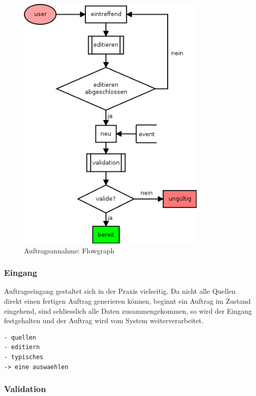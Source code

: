 \begin{figure}[ht]
  \centering
  \label{fig:lebenszyklus-auftrag-eingang}
  \includegraphics[height=5in]{imageinput/lebenszyklus-auftrag-eingang.png}
  \caption{Auftragsannahme: Flowgraph}
\end{figure}


\subsubsection{Eingang}

Auftragseingang gestaltet sich in der Praxis vielseitig.
Da nicht alle Quellen direkt einen fertigen Auftrag generieren k\"onnen,
beginnt ein Auftrag im Zustand eingehend, sind schliesslich alle Daten zusammengekommen,
so wird der Eingang festgehalten und der Auftrag wird vom System weiterverarbeitet.



\begin{verbatim}
- quellen
- editiern
- typisches
-> eine auswaehlen
\end{verbatim}

\subsubsection{Validation}


